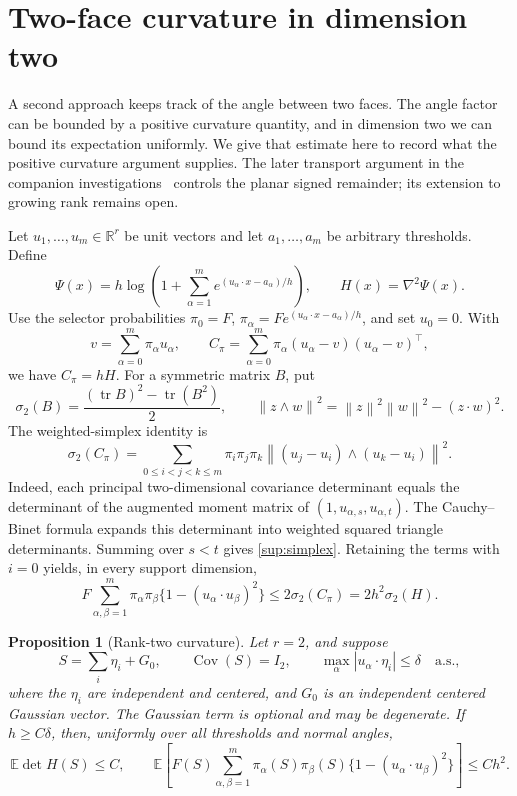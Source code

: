 \documentclass[11pt,a4paper]{article}
\newtheorem{proposition}{Proposition}
\theoremstyle{remark}
\newcommand{\E}{\mathbb E}
\newcommand{\R}{\mathbb R}
\newcommand{\Cov}{\operatorname{Cov}}
\newcommand{\tr}{\operatorname{tr}}
\newcommand{\norm}[1]{\left\lVert#1\right\rVert}
\begin{document}
\section{Two-face curvature in dimension two}
\label{sup:curvature}

A second approach keeps track of the angle between two faces. The
angle factor can be bounded by a positive curvature quantity, and in
dimension two we can bound its expectation uniformly. We give that
estimate here to record what the positive curvature argument supplies.
The later transport argument in the companion investigations~\cite{Cancellation}
controls the planar signed remainder; its extension to growing rank
remains open.

Let \(u_1,\ldots,u_m\in\R^r\) be unit vectors and let
\(a_1,\ldots,a_m\) be arbitrary thresholds. Define
\[
 \Psi(x)=h\log\left(1+\sum_{\alpha=1}^m
                    e^{(u_\alpha\cdot x-a_\alpha)/h}\right),
 \qquad H(x)=\nabla^2\Psi(x).
\]
Use the selector probabilities
\(\pi_0=F\),
\(\pi_\alpha=Fe^{(u_\alpha\cdot x-a_\alpha)/h}\), and set
\(u_0=0\). With
\[
 v=\sum_{\alpha=0}^m\pi_\alpha u_\alpha,\qquad
 C_\pi=\sum_{\alpha=0}^m\pi_\alpha
             (u_\alpha-v)(u_\alpha-v)^\top,
\]
we have \(C_\pi=hH\). For a symmetric matrix \(B\), put
\[
 \sigma_2(B)=\frac{(\tr B)^2-\tr(B^2)}2,
 \qquad
 \norm{z\wedge w}^2=\norm z^2\norm w^2-(z\cdot w)^2.
\]
The weighted-simplex identity is
\begin{equation}
 \sigma_2(C_\pi)
 =\sum_{0\le i<j<k\le m}
     \pi_i\pi_j\pi_k
       \norm{(u_j-u_i)\wedge(u_k-u_i)}^2.
 \label{sup:simplex}
\end{equation}
Indeed, each principal two-dimensional covariance determinant equals
the determinant of the augmented moment matrix of
\((1,u_{\alpha,s},u_{\alpha,t})\). The Cauchy--Binet formula expands
this determinant into weighted squared triangle determinants.
Summing over \(s<t\) gives \eqref{sup:simplex}. Retaining the
terms with \(i=0\) yields, in every support dimension,
\begin{equation}
 F\sum_{\alpha,\beta=1}^m
    \pi_\alpha\pi_\beta\{1-(u_\alpha\cdot u_\beta)^2\}
 \le 2\sigma_2(C_\pi)=2h^2\sigma_2(H).
 \label{sup:angle-curvature}
\end{equation}

\begin{proposition}[Rank-two curvature]
\label{sup:rank-two}
Let \(r=2\), and suppose
\[
 S=\sum_i\eta_i+G_0,\qquad \Cov(S)=I_2,
 \qquad \max_\alpha|u_\alpha\cdot\eta_i|\le\delta
 \quad\text{a.s.},
\]
where the \(\eta_i\) are independent and centered, and \(G_0\)
is an independent centered Gaussian vector. The Gaussian term is
optional and may be degenerate. If \(h\ge C\delta\), then,
uniformly over all thresholds and normal angles,
\begin{equation}
 \E\det H(S)\le C,
 \qquad
 \E\left[F(S)\sum_{\alpha,\beta=1}^m
   \pi_\alpha(S)\pi_\beta(S)
       \{1-(u_\alpha\cdot u_\beta)^2\}\right]\le Ch^2.
 \label{sup:rank-two-bound}
\end{equation}
\end{proposition}
\end{document}
